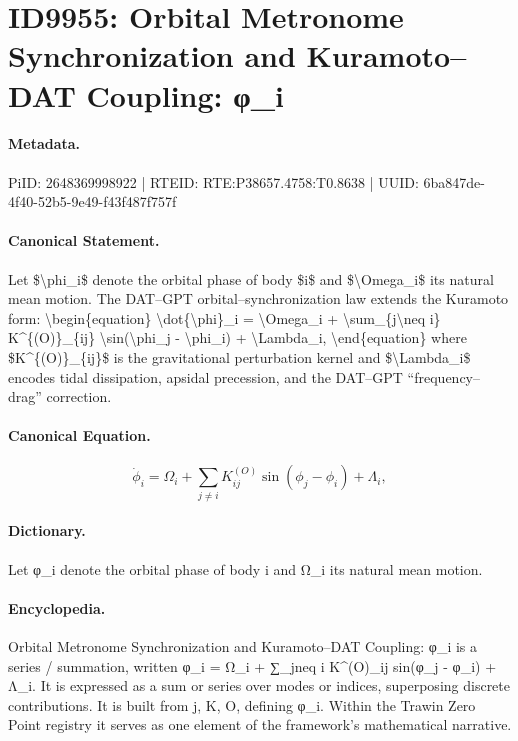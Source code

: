 \section*{ID9955: Orbital Metronome Synchronization and Kuramoto–DAT Coupling: φ\_i}
\paragraph{Metadata.}
PiID: 2648369998922 | RTEID: RTE:P38657.4758:T0.8638 | UUID: 6ba847de-4f40-52b5-9e49-f43f487f757f

\paragraph{Canonical Statement.}
Let \$\textbackslash{}phi\_i\$ denote the orbital phase of body \$i\$ and \$\textbackslash{}Omega\_i\$ its natural mean motion. The DAT--GPT orbital–synchronization law extends the Kuramoto form: \textbackslash{}begin\{equation\} \textbackslash{}dot\{\textbackslash{}phi\}\_i = \textbackslash{}Omega\_i + \textbackslash{}sum\_\{j\textbackslash{}neq i\} K\textasciicircum{}\{(O)\}\_\{ij\} \textbackslash{}sin(\textbackslash{}phi\_j - \textbackslash{}phi\_i) + \textbackslash{}Lambda\_i, \textbackslash{}end\{equation\} where \$K\textasciicircum{}\{(O)\}\_\{ij\}\$ is the gravitational perturbation kernel and \$\textbackslash{}Lambda\_i\$ encodes tidal dissipation, apsidal precession, and the DAT--GPT ``frequency–drag'' correction.

\paragraph{Canonical Equation.}
\[
\dot{\phi}_i = \Omega_i + \sum_{j\neq i} K^{(O)}_{ij} \sin(\phi_j - \phi_i) + \Lambda_i,
\]

\paragraph{Dictionary.}
Let φ\_i denote the orbital phase of body i and Ω\_i its natural mean motion.

\paragraph{Encyclopedia.}
Orbital Metronome Synchronization and Kuramoto–DAT Coupling: φ\_i is a series / summation, written φ\_i = Ω\_i + ∑\_jneq i K\textasciicircum{}(O)\_ij sin(φ\_j - φ\_i) + Λ\_i. It is expressed as a sum or series over modes or indices, superposing discrete contributions. It is built from j, K, O, defining φ\_i. Within the Trawin Zero Point registry it serves as one element of the framework's mathematical narrative.
